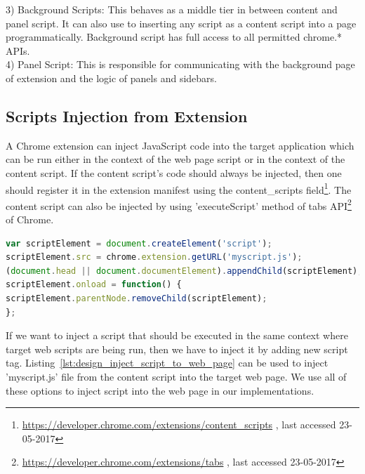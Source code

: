 3) Background Scripts: This behaves as a middle tier in between content and panel script. It can also use to inserting any script as a content script into a page programmatically. Background script has full access to all permitted chrome.* APIs.\\

4) Panel Script: This is responsible for communicating with the background page of extension and the logic of panels and sidebars.\\ 

\subsection{Scripts Injection from Extension}

A Chrome extension can inject JavaScript code into the target application which can be run either in the context of the web page script or in the context of the content script. If the content script's code should always be injected, then one should register it in the extension manifest using the content_scripts field\footnote{\url{https://developer.chrome.com/extensions/content_scripts} , last accessed 23-05-2017}.
The content script can also be injected by using 'executeScript' method of tabs API\footnote{\url{https://developer.chrome.com/extensions/tabs} , last accessed 23-05-2017}  of Chrome.


\begin{lstlisting}[language=JavaScript, caption=Injecting Script into Web Page Context, label={lst:design_inject_script_to_web_page}]
var scriptElement = document.createElement('script');
scriptElement.src = chrome.extension.getURL('myscript.js');
(document.head || document.documentElement).appendChild(scriptElement);
scriptElement.onload = function() {
scriptElement.parentNode.removeChild(scriptElement);
};
\end{lstlisting}

If we want to inject a script that should be executed in the same context where target web scripts are being run, then we have to inject it by adding new script tag. Listing~\ref{lst:design_inject_script_to_web_page} can be used to inject 'myscript.js' file from the content script into the target web page. We use all of these options to inject script into the web page in our implementations.